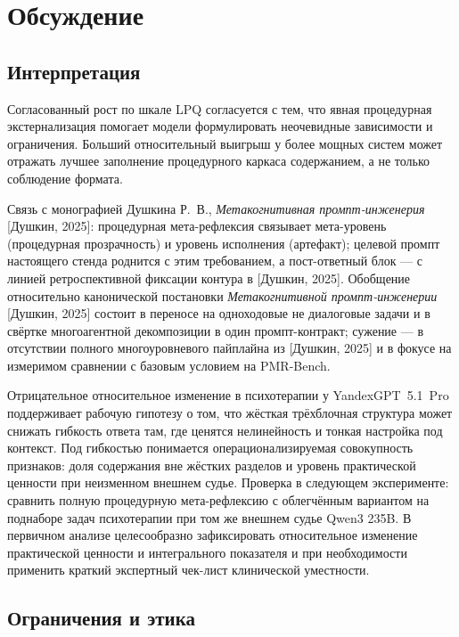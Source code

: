 \documentclass[a4paper,12pt]{article}
\begin{document}
\section{Обсуждение}

\subsection{Интерпретация}

Согласованный рост по шкале LPQ согласуется с тем, что явная процедурная экстернализация помогает модели формулировать неочевидные зависимости и ограничения. Больший относительный выигрыш у более мощных систем может отражать лучшее заполнение процедурного каркаса содержанием, а не только соблюдение формата.

Связь с монографией Душкина Р.~В., \textit{Метакогнитивная промпт-инженерия} [Душкин, 2025]: процедурная мета-рефлексия связывает мета-уровень (процедурная прозрачность) и уровень исполнения (артефакт); целевой промпт настоящего стенда роднится с этим требованием, а пост-ответный блок --- с линией ретроспективной фиксации контура в [Душкин, 2025]. Обобщение относительно канонической постановки \textit{Метакогнитивной промпт-инженерии} [Душкин, 2025] состоит в переносе на одноходовые не диалоговые задачи и в свёртке многоагентной декомпозиции в один промпт-контракт; сужение --- в отсутствии полного многоуровневого пайплайна из [Душкин, 2025] и в фокусе на измеримом сравнении с базовым условием на PMR-Bench.

Отрицательное относительное изменение в психотерапии у YandexGPT~5.1~Pro поддерживает рабочую гипотезу о том, что жёсткая трёхблочная структура может снижать гибкость ответа там, где ценятся нелинейность и тонкая настройка под контекст. Под гибкостью понимается операционализируемая совокупность признаков: доля содержания вне жёстких разделов и уровень практической ценности при неизменном внешнем судье. Проверка в следующем эксперименте: сравнить полную процедурную мета-рефлексию с облегчённым вариантом на поднаборе задач психотерапии при том же внешнем судье Qwen3 235B. В первичном анализе целесообразно зафиксировать относительное изменение практической ценности и интегрального показателя и при необходимости применить краткий экспертный чек-лист клинической уместности.

\subsection{Ограничения и этика}
\end{document}
